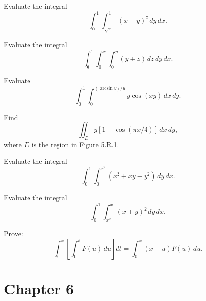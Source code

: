 \documentclass[openany]{book}
\begin{document}
\begin{prob}[3]
    Evaluate the integral
    \[
    \int_{0}^{1} \int_{\sqrt{x}}^{1} (x+y)^{2} \, dy \, dx.
    \]
\end{prob}

\begin{prob}[9]
    Evaluate the integral
    \[
    \int_{0}^{1} \int_{0}^{x} \int_{0}^{y} (y+z) \, dz \, dy \, dx.
    \]
\end{prob}

\begin{prob}[11]
    Evaluate
    \[
    \int_{0}^{1} \int_{0}^{(\arcsin y)/y} y \cos(xy) \, dx \, dy.
    \]
\end{prob}

\begin{prob}[16]
    Find
    \[
    \iint_{D} y[1-\cos(\pi x/4)] \, dx \, dy,
    \]
    where \( D \) is the region in Figure 5.R.1.
\end{prob}

\begin{prob}[21]
    Evaluate the integral
    \[
    \int_{0}^{1} \int_{0}^{x^2} (x^2 + xy - y^2) \, dy \, dx.
    \]
\end{prob}

\begin{prob}[23]
    Evaluate the integral
    \[
    \int_{0}^{1} \int_{x^2}^{x} (x + y)^2 \, dy \, dx.
    \]
\end{prob}

\begin{prob}[33]
    Prove:
    \[
    \int_{0}^{x} \left[ \int_{0}^{t} F(u) \, du \right] dt = \int_{0}^{x} (x - u) F(u) \, du.
    \]
\end{prob}


\section{Chapter 6}
\end{document}
